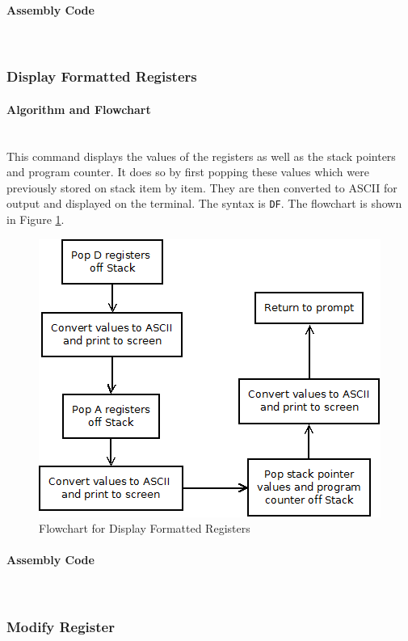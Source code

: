 \documentclass[12pt]{article}
\begin{document}
			\paragraph{Assembly Code}~\\				%
			
			\subsubsection{Display Formatted Registers}
		
			\paragraph{Algorithm and Flowchart}~\\
				This command displays the values of the registers as well as the stack pointers and program counter. It does so by first popping these values which were previously stored on stack item by item. They are then converted to ASCII for output and displayed on the terminal. The syntax is \texttt{DF}. The flowchart is shown in Figure \ref{fig:DF}.
			
			
\begin{figure}[H]
\centering
\includegraphics[width=0.7\linewidth]{DF}
\caption{Flowchart for Display Formatted Registers}
\label{fig:DF}
\end{figure}
			\paragraph{Assembly Code}~\\				%
			
			\subsubsection{Modify Register}
		
\end{document}
